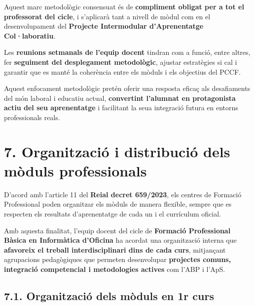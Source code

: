 \documentclass[
  paper=a4,
  ,captions=tableheading
]{scrartcl}
\begin{document}
Aquest marc metodològic consensuat és de \textbf{compliment obligat per
a tot el professorat del cicle}, i s'aplicarà tant a nivell de mòdul com
en el desenvolupament del \textbf{Projecte Intermodular d'Aprenentatge
Col·laboratiu}.

Les \textbf{reunions setmanals de l'equip docent} tindran com a funció,
entre altres, fer \textbf{seguiment del desplegament metodològic},
ajustar estratègies si cal i garantir que es manté la coherència entre
els mòduls i els objectius del PCCF.

Aquest enfocament metodològic pretén oferir una resposta eficaç als
desafiaments del món laboral i educatiu actual, \textbf{convertint
l'alumnat en protagonista actiu del seu aprenentatge} i facilitant la
seua integració futura en entorns professionals reals.

\hypertarget{organitzaciuxf3-i-distribuciuxf3-dels-muxf2duls-professionals}{%
\section{7. Organització i distribució dels mòduls
professionals}\label{organitzaciuxf3-i-distribuciuxf3-dels-muxf2duls-professionals}}

D'acord amb l'article 11 del \textbf{Reial decret 659/2023}, els centres
de Formació Professional poden organitzar els mòduls de manera flexible,
sempre que es respecten els resultats d'aprenentatge de cada un i el
currículum oficial.

Amb aquesta finalitat, l'equip docent del cicle de \textbf{Formació
Professional Bàsica en Informàtica d'Oficina} ha acordat una
organització interna que \textbf{afavoreix el treball interdisciplinari
dins de cada curs}, mitjançant agrupacions pedagògiques que permeten
desenvolupar \textbf{projectes comuns, integració competencial i
metodologies actives} com l'ABP i l'ApS.

\hypertarget{organitzaciuxf3-dels-muxf2duls-en-1r-curs}{%
\subsection{\texorpdfstring{7.1. Organització dels mòduls en \textbf{1r
curs}}{7.1. Organització dels mòduls en 1r curs}}\label{organitzaciuxf3-dels-muxf2duls-en-1r-curs}}
\end{document}
